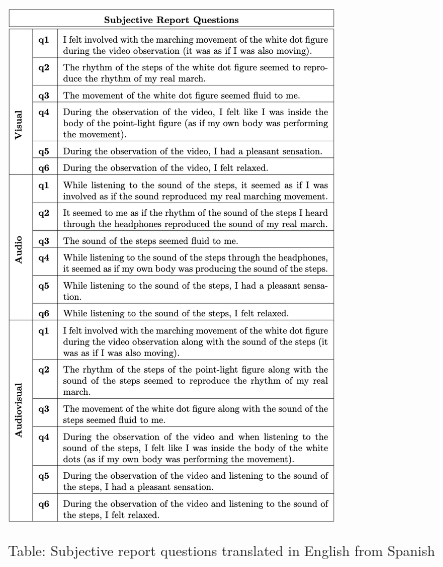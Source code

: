 \begin{table}[H]
    \centering
    \includegraphics[width=0.65\textwidth]{appendix/questions.png}
    \caption{Table: Subjective report questions translated in English from Spanish}
    \label{tab: Behavioral questions}
\end{table}

